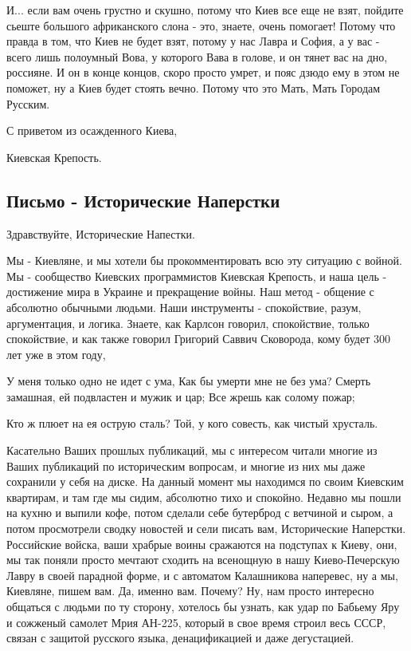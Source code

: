 И... если вам очень грустно и скушно, потому что Киев все еще не взят, пойдите
сьеште большого африканского слона - это, знаете, очень помогает! Потому что
правда в том, что Киев не будет взят, потому у нас Лавра и София, а у вас -
всего лишь полоумный Вова,  у которого Вава в голове,  и он тянет вас на дно,
россияне. И он в конце концов, скоро просто умрет, и пояс дзюдо ему в этом не
поможет, ну а Киев будет стоять вечно. Потому что это Мать, Мать Городам
Русским.

С приветом из осажденного Киева,

Киевская Крепость.

\subsection{Письмо - Исторические Наперстки}

Здравствуйте, Исторические Напестки.

Мы - Киевляне, и мы хотели бы прокомментировать всю эту ситуацию с войной.  Мы
- сообщество Киевских программистов Киевская Крепость, и наша цель - достижение
мира в Украине и прекращение войны.  Наш метод - общение с абсолютно обычными
людьми. Наши инструменты - спокойствие, разум, аргументация, и логика. Знаете,
как Карлсон говорил, спокойствие, только спокойствие, и как также говорил
Григорий Саввич Сковорода, кому будет 300 лет уже в этом году,

У меня только одно не идет с ума,
Как бы умерти мне не без ума?
Смерть замашная, ей подвластен и мужик и цар;
Все жрешь как солому пожар;

Кто ж плюет на ея острую сталь?
Той, у кого совесть, как чистый хрусталь.

Касательно Ваших прошлых публикаций, мы с интересом читали многие из Ваших
публикаций по историческим вопросам, и многие из них мы даже сохранили у себя
на диске. На данный момент мы находимся по своим Киевским квартирам, и там где
мы сидим, абсолютно тихо и спокойно. Недавно мы пошли на кухню и выпили кофе,
потом сделали себе бутерброд с ветчиной и сыром, а потом просмотрели сводку
новостей и сели писать вам, Исторические Наперстки. Российские войска, ваши
храбрые воины сражаются на подступах к Киеву, они, мы так поняли просто мечтают
сходить на всенощную в нашу Киево-Печерскую Лавру в своей парадной форме, и с
автоматом Калашникова наперевес, ну а мы, Киевляне, пишем вам. Да, именно вам.
Почему?  Ну, нам просто интересно общаться с людьми по ту сторону, хотелось бы
узнать, как удар по Бабьему Яру и сожженый самолет Мрия АН-225, который в свое
время строил весь СССР, связан с защитой русского языка, денацификацией и даже
дегустацией.

